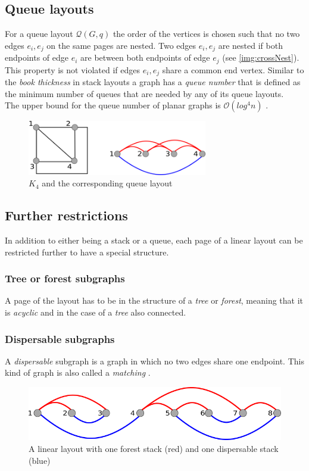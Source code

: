 \subsection{Queue layouts}
For a queue layout $\mathcal{Q}(G,q)$ the order of the vertices is chosen such that no two edges $e_i, e_j$ on the same pages are nested. Two edges $e_i, e_j$ are nested if both endpoints of edge $e_i$ are between both endpoints of edge $e_j$ (see \autoref{img:crossNest}). This property is not violated if edges $e_i, e_j$ share a common end vertex.
Similar to the \textit{book thickness} in stack layouts a graph has a \textit{queue number} that is defined as the minimum number of queues that are needed by any of its queue layouts.\\
The upper bound for the queue number of planar graphs is $\mathcal{O}(log^4 n)$ \cite{di2013queue}.
\begin{figure}[!h]
\begin{center}
\includegraphics[width=0.7\textwidth]{figures/K4Queue.png}
\caption{$K_4$ and the corresponding queue layout}
\label{img:queueK4}
\end{center}
\end{figure}
\subsection{Further restrictions}
In addition to either being a stack or a queue, each page of a linear layout can be restricted further to have a special structure.
\subsubsection{Tree or forest subgraphs}
A page of the layout has to be in the structure of a \textit{tree} or \textit{forest}, meaning that it is \textit{acyclic} and in the case of a \textit{tree} also connected.
\subsubsection{Dispersable subgraphs}
A \textit{dispersable} subgraph is a graph in which no two edges share one endpoint. This kind of graph is also called a \textit{matching} \cite{kaufmann2018dispersable}. 
\begin{figure}[h!]
\begin{center}
\includegraphics[width=1\textwidth]{figures/ForestDisp.png}
\caption{A linear layout with one forest stack (red) and one dispersable stack (blue)}
\label{img:plzhltr}
\end{center}
\end{figure} 
